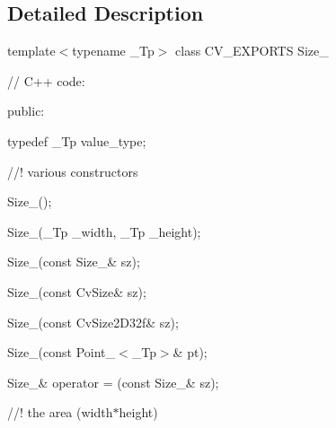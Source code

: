 \subsection{Detailed Description}
template$<$typename \+\_\+\+Tp$>$ class C\+V\+\_\+\+E\+X\+P\+O\+R\+TS Size\+\_\+ {\ttfamily }

{\ttfamily }

{\ttfamily }

{\ttfamily // C++ code\+:}

{\ttfamily }

{\ttfamily }

{\ttfamily public\+:}

{\ttfamily }

{\ttfamily }

{\ttfamily typedef \+\_\+\+Tp value\+\_\+type;}

{\ttfamily }

{\ttfamily }

{\ttfamily //! various constructors}

{\ttfamily }

{\ttfamily }

{\ttfamily Size\+\_\+();}

{\ttfamily }

{\ttfamily }

{\ttfamily Size\+\_\+(\+\_\+\+Tp \+\_\+width, \+\_\+\+Tp \+\_\+height);}

{\ttfamily }

{\ttfamily }

{\ttfamily Size\+\_\+(const Size\+\_\+\& sz);}

{\ttfamily }

{\ttfamily }

{\ttfamily Size\+\_\+(const Cv\+Size\& sz);}

{\ttfamily }

{\ttfamily }

{\ttfamily Size\+\_\+(const Cv\+Size2\+D32f\& sz);}

{\ttfamily }

{\ttfamily }

{\ttfamily Size\+\_\+(const Point\+\_\+$<$\+\_\+\+Tp$>$\& pt);}

{\ttfamily }

{\ttfamily }

{\ttfamily Size\+\_\+\& operator = (const Size\+\_\+\& sz);}

{\ttfamily }

{\ttfamily }

{\ttfamily //! the area (width$\ast$height)}

